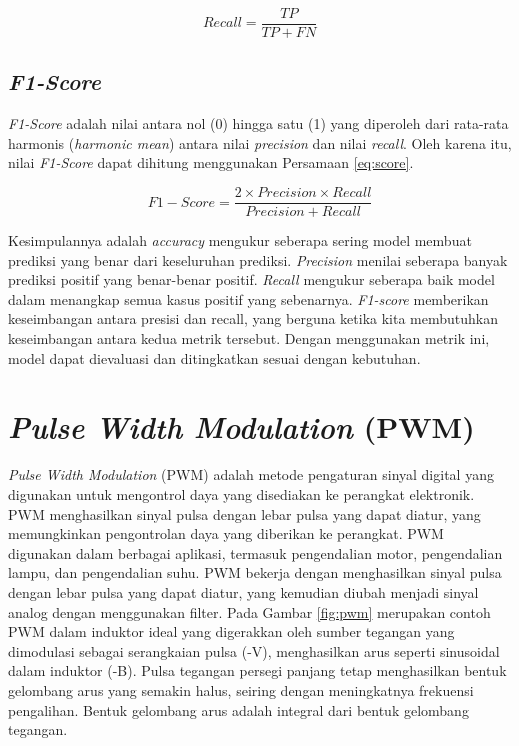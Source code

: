 \begin{equation}
  \label{eq:recall}
  Recall=\frac{TP}{TP+FN}
\end{equation}

\subsection{\emph{F1-Score}}
\label{subsec:score_klasifikasi}

\emph{F1-Score} adalah nilai antara nol (0) hingga satu (1) yang diperoleh dari rata-rata harmonis (\emph{harmonic mean}) antara nilai \emph{precision} dan nilai \emph{recall}. Oleh karena itu, nilai \emph{F1-Score} dapat dihitung menggunakan Persamaan \ref{eq:score}.

\begin{equation}
  \label{eq:score}
  F{1}{-}Score=\frac{2 \times Precision \times Recall}{Precision+Recall}
\end{equation}

Kesimpulannya adalah \emph{accuracy} mengukur seberapa sering model membuat prediksi yang benar dari keseluruhan prediksi. \emph{Precision} menilai seberapa banyak prediksi positif yang benar-benar positif. \emph{Recall} mengukur seberapa baik model dalam menangkap semua kasus positif yang sebenarnya. \emph{F1-score} memberikan keseimbangan antara presisi dan recall, yang berguna ketika kita membutuhkan keseimbangan antara kedua metrik tersebut. Dengan menggunakan metrik ini, model dapat dievaluasi dan ditingkatkan sesuai dengan kebutuhan.

\section{\emph{Pulse Width Modulation} (PWM)}

\emph{Pulse Width Modulation} (PWM) adalah metode pengaturan sinyal digital yang digunakan untuk mengontrol daya yang disediakan ke perangkat elektronik. PWM menghasilkan sinyal pulsa dengan lebar pulsa yang dapat diatur, yang memungkinkan pengontrolan daya yang diberikan ke perangkat. PWM digunakan dalam berbagai aplikasi, termasuk pengendalian motor, pengendalian lampu, dan pengendalian suhu. PWM bekerja dengan menghasilkan sinyal pulsa dengan lebar pulsa yang dapat diatur, yang kemudian diubah menjadi sinyal analog dengan menggunakan filter. Pada Gambar \ref{fig:pwm} merupakan contoh PWM dalam induktor ideal yang digerakkan oleh sumber tegangan yang dimodulasi sebagai serangkaian pulsa (-V), menghasilkan arus seperti sinusoidal dalam induktor (-B). Pulsa tegangan persegi panjang tetap menghasilkan bentuk gelombang arus yang semakin halus, seiring dengan meningkatnya frekuensi pengalihan. Bentuk gelombang arus adalah integral dari bentuk gelombang tegangan. 

